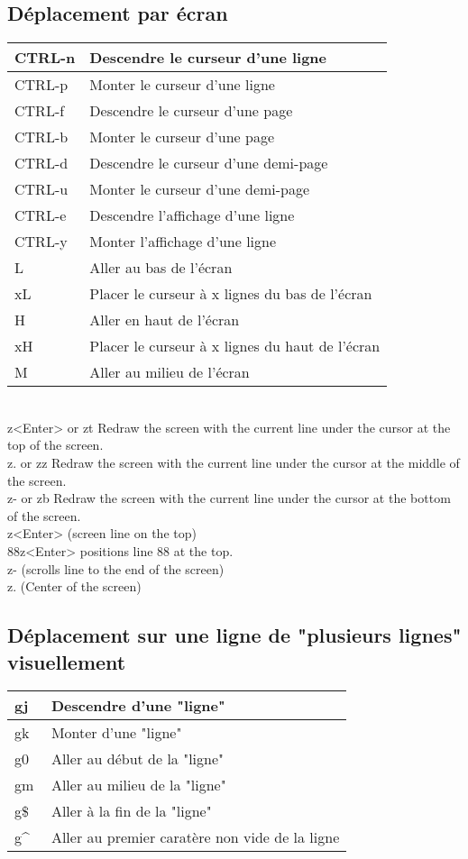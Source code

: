 \documentclass{article}
\begin{document}
\subsection{Déplacement par écran}
\begin{tabular}{|p{3cm}| l| }
    \hline
    CTRL-n & Descendre le curseur d'une ligne \\ \hline
    CTRL-p & Monter le curseur d'une ligne\\ \hline
    CTRL-f & Descendre le curseur d'une page\\ \hline
    CTRL-b & Monter le curseur d'une page\\ \hline
    CTRL-d & Descendre le curseur d'une demi-page\\ \hline
    CTRL-u & Monter le curseur d'une demi-page\\ \hline
    CTRL-e & Descendre l'affichage d'une ligne\\ \hline
    CTRL-y & Monter l'affichage d'une ligne\\ \hline
    L & Aller au bas de l'écran\\ \hline
    xL & Placer le curseur à x lignes du bas de l'écran \\ \hline
    H & Aller en haut de l'écran \\ \hline
    xH & Placer le curseur à x lignes du haut de l'écran \\ \hline
    M & Aller au milieu de l'écran\\ \hline
\end{tabular}\\

z<Enter> or zt Redraw the screen with the current line under the cursor at the top of the screen.\\
z.  or zz Redraw the screen with the current line under the cursor at the middle of the screen.\\
z- or zb Redraw the screen with the current line under the cursor at the bottom of the screen.\\

z<Enter> (screen line on the top)\\
88z<Enter> positions line 88 at the top.\\
z- (scrolls line to the end of the screen)\\
z. (Center of the screen)

\subsection{Déplacement sur une ligne de "plusieurs lignes" visuellement }
\begin{tabular}{|p{3cm}| l| }
    \hline
    gj & Descendre d'une "ligne"\\ \hline
    gk & Monter d'une "ligne"\\ \hline
    g0 & Aller au début de la "ligne"\\ \hline
    gm & Aller au milieu de la "ligne"\\ \hline
    g\$ & Aller à la fin de la "ligne"\\ \hline
    g\^~ & Aller au premier caratère non vide de la ligne\\ \hline
\end{tabular}\\
\end{document}
